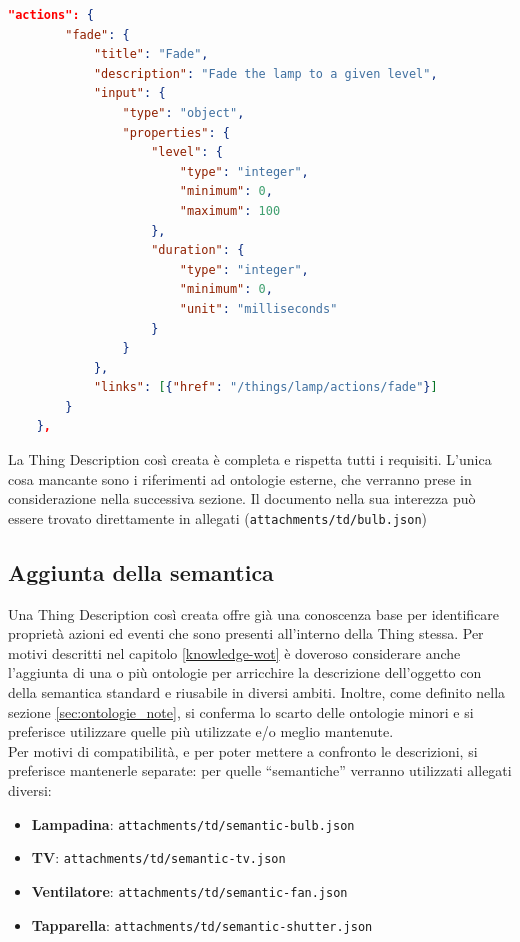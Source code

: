 \documentclass[12pt,a4paper,openright,oneside]{report}
\newcommand{\quotes}[1]{``#1''}
\begin{document}
\clearpage
\begin{lstlisting}[language=json,caption={Azioni di una lampadina},label=lst:start4-td-lamp]
	"actions": {
		"fade": {
			"title": "Fade",
			"description": "Fade the lamp to a given level",
			"input": {
				"type": "object",
				"properties": {
					"level": {
						"type": "integer",
						"minimum": 0,
						"maximum": 100
					},
					"duration": {
						"type": "integer",
						"minimum": 0,
						"unit": "milliseconds"
					}
				}
			},
			"links": [{"href": "/things/lamp/actions/fade"}]
		}
	},
\end{lstlisting}

La Thing Description così creata è completa e rispetta tutti i requisiti. L'unica cosa mancante sono i riferimenti ad ontologie esterne, che verranno prese in considerazione nella successiva sezione. Il documento nella sua interezza può essere trovato direttamente in allegati (\texttt{attachments/td/bulb.json})

\subsection{Aggiunta della semantica}
Una Thing Description così creata offre già una conoscenza base per identificare proprietà azioni ed eventi che sono presenti all'interno della Thing stessa. Per motivi descritti nel capitolo \ref{knowledge-wot} è doveroso considerare anche l'aggiunta di una o più ontologie per arricchire la descrizione dell'oggetto con della semantica standard e riusabile in diversi ambiti. Inoltre, come definito nella sezione \ref{sec:ontologie_note}, si conferma lo scarto delle ontologie minori e si preferisce utilizzare quelle più utilizzate e/o meglio mantenute.\\

Per motivi di compatibilità, e per poter mettere a confronto le descrizioni, si preferisce mantenerle separate: per quelle \quotes{semantiche} verranno utilizzati allegati diversi:
\begin{itemize}
	\setlength\itemsep{-0.3em}
	\item \textbf{Lampadina}: \texttt{attachments/td/semantic-bulb.json}
	\item \textbf{TV}: \texttt{attachments/td/semantic-tv.json}
	\item \textbf{Ventilatore}: \texttt{attachments/td/semantic-fan.json}
	\item \textbf{Tapparella}: \texttt{attachments/td/semantic-shutter.json}
\end{itemize}
\end{document}
